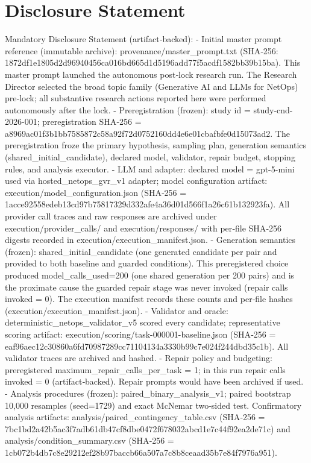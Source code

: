 \documentclass[conference]{IEEEtran}
\begin{document}
\section*{Disclosure Statement}
Mandatory Disclosure Statement (artifact‑backed):
- Initial master prompt reference (immutable archive): provenance/master\_prompt.txt (SHA‑256: 1872df1e1805d2d96940456ca016bd665d1d5196add77f5acdf1582bb39b15ba). This master prompt launched the autonomous post‑lock research run. The Research Director selected the broad topic family (Generative AI and LLMs for NetOps) pre‑lock; all substantive research actions reported here were performed autonomously after the lock.
- Preregistration (frozen): study id = study-cnd-2026-001; preregistration SHA‑256 = a8969ac01f3b1bb7585872c58a92f72d0752160dd4e6e01cbafbfe0d15073ad2. The preregistration froze the primary hypothesis, sampling plan, generation semantics (shared\_initial\_candidate), declared model, validator, repair budget, stopping rules, and analysis executor.
- LLM and adapter: declared model = gpt-5-mini used via hosted\_netops\_gvr\_v1 adapter; model configuration artifact: execution/model\_configuration.json (SHA‑256 = 1acce92558edeb13cd97b75817329d332afe4a36d01d566f1a26c61b132923fa). All provider call traces and raw responses are archived under execution/provider\_calls/ and execution/responses/ with per‑file SHA‑256 digests recorded in execution/execution\_manifest.json.
- Generation semantics (frozen): shared\_initial\_candidate (one generated candidate per pair and provided to both baseline and guarded conditions). This preregistered choice produced model\_calls\_used=200 (one shared generation per 200 pairs) and is the proximate cause the guarded repair stage was never invoked (repair calls invoked = 0). The execution manifest records these counts and per‑file hashes (execution/execution\_manifest.json).
- Validator and oracle: deterministic\_netops\_validator\_v5 scored every candidate; representative scoring artifact: execution/scoring/task-000001-baseline.json (SHA‑256 = eaf96aec12c30860a6fd70987289cc71104134a3330b99c7e024f244dbd35c1b). All validator traces are archived and hashed.
- Repair policy and budgeting: preregistered maximum\_repair\_calls\_per\_task = 1; in this run repair calls invoked = 0 (artifact‑backed). Repair prompts would have been archived if used.
- Analysis procedures (frozen): paired\_binary\_analysis\_v1; paired bootstrap 10,000 resamples (seed=1729) and exact McNemar two‑sided test. Confirmatory analysis artifacts: analysis/paired\_contingency\_table.csv (SHA‑256 = 7bc1bd2a42b5ac3f7adb61db47cf8dbe0472f678032abcd1e7c44f92ea2de71c) and analysis/condition\_summary.csv (SHA‑256 = 1cb072b4db7c8e29212ef28b97baccb66a507a7c8b8ceaad35b7e84f7976a951).
\end{document}
